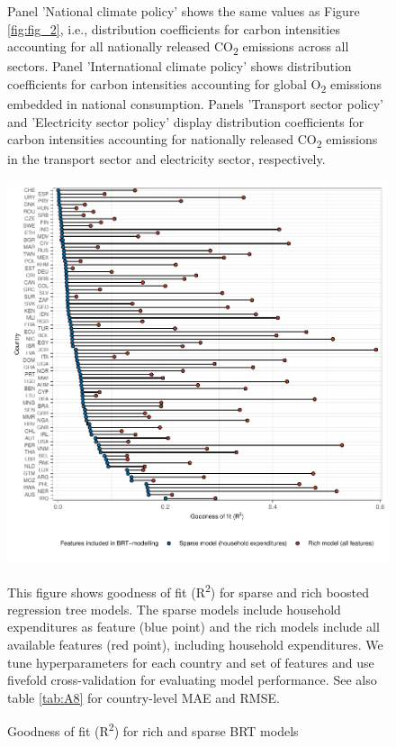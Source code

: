 \documentclass[12pt, a4paper]{article}
\newenvironment{subcaption2}
{\strut
\vspace{-5pt}
\begin{minipage}[b]{0.95\textwidth}
  \hspace*{-\parindent}
  \footnotesize}
 {\end{minipage}}
\begin{document}
\begin{refsection}
\begin{figure}[ht!]
\begin{subcaption2}
    Panel 'National climate policy' shows the same values as Figure \ref{fig:fig_2}, i.e., distribution coefficients for carbon intensities accounting for all nationally released CO\textsubscript{2} emissions across all sectors. Panel 'International climate policy' shows distribution coefficients for carbon intensities accounting for global  O\textsubscript{2} emissions embedded in national consumption. Panels 'Transport sector policy' and 'Electricity sector policy' display distribution coefficients for carbon intensities accounting for nationally released CO\textsubscript{2} emissions in the transport sector and electricity sector, respectively.
    \end{subcaption2}
\end{figure}
\clearpage

\begin{figure}[ht!]
    \centering
    \includegraphics[width=\textwidth]{1_Figures/Figures_Appendix/Figure_Comparison_Models.pdf}
    \caption{Goodness of fit (R\textsuperscript{2}) for rich and sparse BRT models}\label{fig:comparison}
    \label{fig:comparison_models}
    \begin{subcaption2}
    This figure shows goodness of fit (R\textsuperscript{2}) for sparse and rich boosted regression tree models. The sparse models include household expenditures as feature (blue point) and the rich models include all available features (red point), including household expenditures. We tune hyperparameters for each country and set of features and use fivefold cross-validation for evaluating model performance. See also table \ref{tab:A8} for country-level MAE and RMSE.
    \end{subcaption2}
\end{figure}


\end{refsection}
\end{document}
